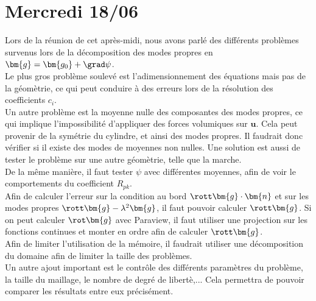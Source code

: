 \section{Mercredi 18/06}

Lors de la réunion de cet après-midi, nous avons parlé des différents problèmes survenus lors de la décomposition des modes propres en $\bm{g}=\bm{g_0}+\grad\psi$.\\
Le plus gros problème soulevé est l'adimensionnement des équations mais pas de la géomètrie, ce qui peut conduire à des erreurs lors de la résolution des coefficients $c_i$.\\
Un autre problème est la moyenne nulle des composantes des modes propres, ce qui implique l'impossibilité d'appliquer des forces volumiques sur $\bm{u}$. Cela peut provenir de la symétrie du cylindre, et ainsi des modes propres. Il faudrait donc vérifier si il existe des modes de moyennes non nulles. Une solution est aussi de tester le problème sur une autre géomètrie, telle que la marche.\\
De la même manière, il faut tester $\psi$ avec différentes moyennes, afin de voir le comportements du coefficient $R_{pk}$.\\

Afin de calculer l'erreur sur la condition au bord $\rott\bm{g}\cdot\bm{n}$ et sur les modes propres $\rott\bm{g}-\lambda^2\bm{g}$, il faut pouvoir calculer $\rott\bm{g}$. Si on peut calculer $\rot\bm{g}$ avec Paraview, il faut utiliser une projection sur les fonctions continues et monter en ordre afin de calculer $\rott\bm{g}$.\\
Afin de limiter l'utilisation de la mémoire, il faudrait utiliser une décomposition du domaine afin de limiter la taille des problèmes.\\

Un autre ajout important est le contrôle des différents paramètres du problème, la taille du maillage, le nombre de degré de libertè,... Cela permettra de pouvoir comparer les résultats entre eux précisément.





